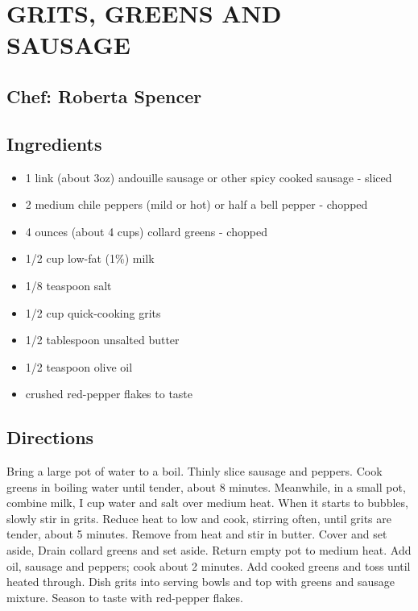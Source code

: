 \documentclass[
]{book}
\providecommand{\tightlist}{%
  \setlength{\itemsep}{0pt}\setlength{\parskip}{0pt}}
\begin{document}
\hypertarget{grits-greens-and-sausage}{%
\section*{GRITS, GREENS AND SAUSAGE}\label{grits-greens-and-sausage}}


\hypertarget{chef-roberta-spencer-19}{%
\subsection*{Chef: Roberta Spencer}\label{chef-roberta-spencer-19}}


\hypertarget{ingredients-58}{%
\subsection*{Ingredients}\label{ingredients-58}}


\begin{itemize}
\tightlist
\item
  1 link (about 3oz) andouille sausage or other spicy cooked sausage - sliced
\item
  2 medium chile peppers (mild or hot) or half a bell pepper - chopped
\item
  4 ounces (about 4 cups) collard greens - chopped
\item
  1/2 cup low-fat (1\%) milk
\item
  1/8 teaspoon salt
\item
  1/2 cup quick-cooking grits
\item
  1/2 tablespoon unsalted butter
\item
  1/2 teaspoon olive oil
\item
  crushed red-pepper flakes to taste
\end{itemize}

\hypertarget{directions-58}{%
\subsection*{Directions}\label{directions-58}}


Bring a large pot of water to a boil. Thinly slice sausage and peppers. Cook greens in boiling water until tender, about 8 minutes. Meanwhile, in a small pot, combine milk, I cup water and salt over medium heat. When it starts to bubbles, slowly stir in grits. Reduce heat to low and cook, stirring often, until grits are tender, about 5 minutes. Remove from heat and stir in butter. Cover and set aside, Drain collard greens and set aside. Return empty pot to medium heat. Add oil, sausage and peppers; cook about 2 minutes. Add cooked greens and toss until heated through. Dish grits into serving bowls and top with greens and sausage mixture. Season to taste with red-pepper flakes.
\end{document}
